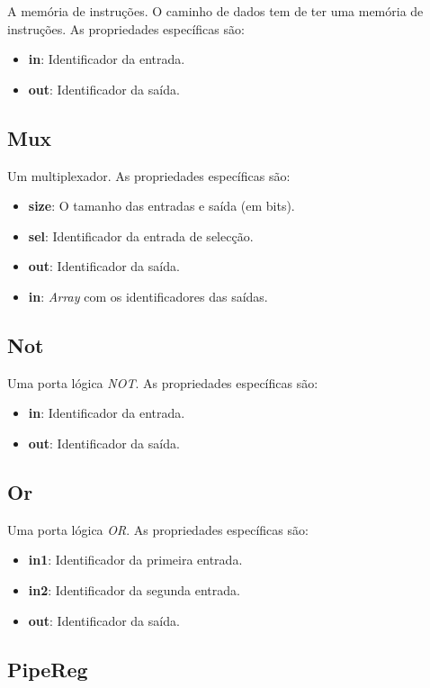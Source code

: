 \documentclass[11pt,a4paper,twoside,titlepage]{report}
\begin{document}
A memória de instruções. O caminho de dados tem de ter uma memória de instruções.
As propriedades específicas são:
\begin{itemize}
	\item \textbf{in}: Identificador da entrada.
	\item \textbf{out}: Identificador da saída.
\end{itemize}

\subsection{Mux}

Um multiplexador. As propriedades específicas são:
\begin{itemize}
	\item \textbf{size}: O tamanho das entradas e saída (em bits).
	\item \textbf{sel}: Identificador da entrada de selecção.
	\item \textbf{out}: Identificador da saída.
	\item \textbf{in}: \emph{Array} com os identificadores das saídas.
\end{itemize}

\subsection{Not}

Uma porta lógica \emph{NOT}. As propriedades específicas são:
\begin{itemize}
	\item \textbf{in}: Identificador da entrada.
	\item \textbf{out}: Identificador da saída.
\end{itemize}

\subsection{Or}

Uma porta lógica \emph{OR}. As propriedades específicas são:
\begin{itemize}
	\item \textbf{in1}: Identificador da primeira entrada.
	\item \textbf{in2}: Identificador da segunda entrada.
	\item \textbf{out}: Identificador da saída.
\end{itemize}

\subsection{PipeReg}
\end{document}
